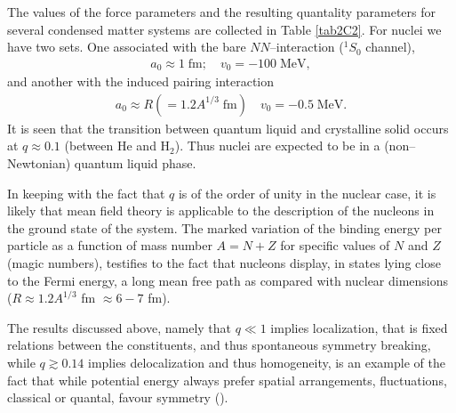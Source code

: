 \documentclass[a4paper,11pt]{book}
\begin{document}
The values of the force parameters and the resulting quantality parameters for several condensed matter systems are collected in Table \ref{tab2C2}. For nuclei we have two sets. One associated with the bare $NN$--interaction ($^1S_0$ channel),
\begin{align}
a_0\approx 1\;\text{fm};\quad v_0=-100\;\text{MeV},
\end{align}  
and another with the induced pairing interaction
\begin{align}
a_0\approx R(=1.2 A^{1/3}\;\text{fm})\quad v_0=-0.5\;\text{MeV}.
\end{align}  
It is seen that the transition between quantum liquid and crystalline solid occurs at $q\approx0.1$ (between He and H$_2$). Thus nuclei are expected to be in a (non--Newtonian) quantum liquid phase.


In keeping with the fact that $q$ is of the order of unity 
 in the nuclear case, it is likely that mean field theory is applicable to the description of the nucleons in the ground state of the system. The marked variation of the binding energy per particle as a function of mass number $A=N+Z$ for specific values of $N$ and $Z$ (magic numbers), testifies to the fact that nucleons display, in states lying close to the Fermi energy, a long mean free path as compared with nuclear dimensions ($R\approx1.2 A^{1/3}$ fm $\approx 6-7$ fm).
 
 
 The results discussed above, namely that $q\ll1$ implies localization, that is fixed relations between the constituents, and thus spontaneous symmetry breaking, while $q\gtrsim0.14$ implies delocalization and thus homogeneity, is an example of the fact that while potential energy always prefer spatial arrangements, fluctuations, classical or quantal, favour symmetry (\cite{Anderson:84}). 
 


\end{document}
